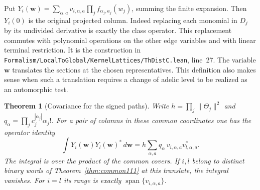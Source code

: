\documentclass[a4paper,11pt]{article}
\newtheorem{theorem}[proposition]{Theorem}
\theoremstyle{definition}
\theoremstyle{remark}
\newcommand{\srcloc}[2]{{\small\nolinkurl{#1.lean}}, line~#2}
\numberwithin{equation}{section}
\begin{document}
Put \(Y_i(\boldsymbol w)=\sum_{\alpha,a}v_{i,\alpha,a}
\prod_j f_{\alpha_j,a_j}(w_j)\), summing the finite expansion.
Then \(Y_i(0)\) is the original projected column. Indeed replacing
each monomial in \(D_j\) by its undivided derivative is exactly
the class operator. This replacement commutes with polynomial
operations on the other edge variables and with linear terminal
restriction. It is the construction in
\srcloc{Formalism/LocalToGlobal/KernelLattices/ThDistC}{27}.
The variable \(\boldsymbol w\) translates the sections at the
chosen representatives. This definition also makes sense when
such a translation requires a change of adelic level to be
realized as an automorphic test.

\begin{theorem}[Covariance for the signed paths]\leavevmode
\label{thm:signedcovariance478}
Write \(h=\prod_j\|\Theta_j\|^2\) and
\(q_\alpha=\prod_j c_j^{|\alpha_j|}\alpha_j!\). For a pair of
columns in these common coordinates one has the operator identity
\[
  \int Y_i(\boldsymbol w)Y_l(\boldsymbol w)^*\,d\boldsymbol w
       =h\sum_{\alpha,a}q_\alpha\,
                          v_{i,\alpha,a}v_{l,\alpha,a}^* .
\]
The integral is over the product of the common covers. If \(i,l\)
belong to distinct binary words of Theorem~\ref{thm:common111}
at this translate, the integral vanishes. For \(i=l\) its range
is exactly \(\operatorname{span}\{v_{i,\alpha,a}\}\).
\end{theorem}
\end{document}
